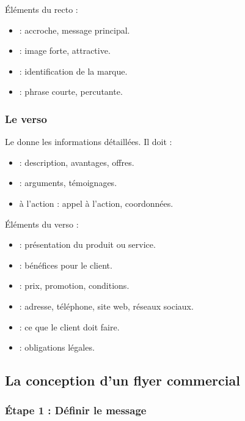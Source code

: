 Éléments du recto :

\begin{itemize}
    \item {} : accroche, message principal.
    \item {} : image forte, attractive.
    \item {} : identification de la marque.
    \item {} : phrase courte, percutante.
\end{itemize}

\subsubsection{Le verso}

Le  donne les informations détaillées. Il doit :

\begin{itemize}
    \item {} : description, avantages, offres.
    \item {} : arguments, témoignages.
    \item {} à l'action : appel à l'action, coordonnées.
\end{itemize}

Éléments du verso :

\begin{itemize}
    \item {} : présentation du produit ou service.
    \item {} : bénéfices pour le client.
    \item {} : prix, promotion, conditions.
    \item {} : adresse, téléphone, site web, réseaux sociaux.
    \item {} : ce que le client doit faire.
    \item {} : obligations légales.
\end{itemize}

\subsection{La conception d'un flyer commercial}

\subsubsection{Étape 1 : Définir le message}

